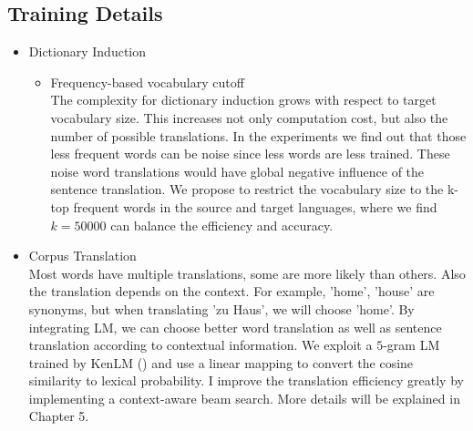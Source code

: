 \subsection{Training Details}
\begin{itemize}
	\item Dictionary Induction
	\begin{itemize}
		 With cross-lingual word embeddings, we can directly find the word translation using nearest neighbors search. The nearest neighbor suffers from the hubness problem. As mentioned in Section 3.4, we adopt the Cross-domain Similarity Local Scaling (CSLS) from \cite{conneau2017word}. Following the authors, we set $k=10$.
		 \item Frequency-based vocabulary cutoff\\
		 The complexity for dictionary induction grows with respect to target vocabulary size. This increases not only  computation cost, but also the number of possible translations. In the experiments we find out that those less frequent words can be noise since less words are less trained. These noise word translations would have global negative influence of the sentence translation.
		 We propose to restrict the vocabulary size to the k-top frequent words in the source and target languages, where we find $k=50000$ can balance the efficiency and accuracy.	 
	\end{itemize}


	\item Corpus Translation\\
	Most words have multiple translations, some are more likely than others. Also the translation depends on the context. For example, 'home', 'house' are synonyms, but when translating 'zu Haus', we will choose 'home'. By integrating LM, we can choose better word translation as well as sentence translation according to contextual information. We exploit a $5$-gram LM trained by KenLM (\cite{heafield2011kenlm}) and use a linear mapping to convert the cosine similarity to lexical probability. I improve the translation efficiency greatly by implementing a context-aware beam search. More details will be explained in Chapter 5.
	




\end{itemize}
